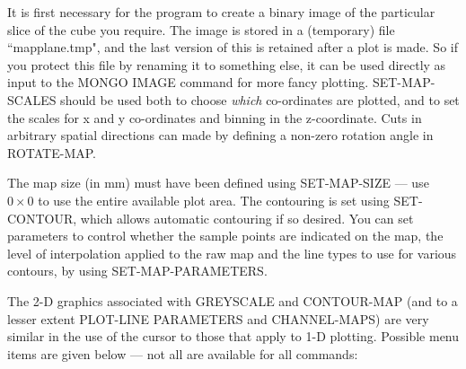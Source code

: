 \documentclass[11pt,twoside]{report}
\begin{document}
It is first necessary
for the program to create a binary image of the particular slice of the cube
you require. The image is stored in a (temporary) file ``mapplane.tmp",
 and the last version of this is retained after a plot is
made. So if you protect this file by renaming it to something else, it can be
used directly as input to the MONGO  IMAGE command
for more fancy plotting. SET-MAP-SCALES should be used both to choose {\em
which} co-ordinates are plotted, and to set the scales for x and y co-ordinates
 and binning in the z-coordinate.  Cuts in arbitrary spatial directions can made by defining a
non-zero rotation angle in ROTATE-MAP. 

The map size  (in mm) must have been defined using SET-MAP-SIZE
--- use $0 \times 0$ to use the entire available plot area. The contouring is
set using SET-CONTOUR, which allows automatic contouring
 if so desired. You can set parameters to control
whether the sample points are indicated on the map, the level of interpolation
 applied to the raw map and the line types to use for
 various contours, by using SET-MAP-PARAMETERS. 

The 2-D graphics associated with GREYSCALE and CONTOUR-MAP (and to a lesser
extent PLOT-LINE PARAMETERS and CHANNEL-MAPS) are very similar in the use of
the cursor  to those that apply to 1-D
plotting. Possible menu items are given below --- not all are available for all
commands: 
\end{document}
